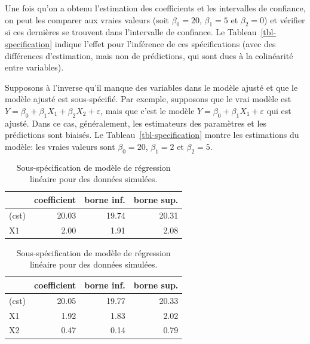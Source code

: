\documentclass[
  11pt,
  letterpaper,
]{scrbook}
\theoremstyle{definition}
\theoremstyle{remark}
\begin{document}
Une fois qu'on a obtenu l'estimation des coefficients et les intervalles
de confiance, on peut les comparer aux vraies valeurs (soit
\(\beta_0 = 20\), \(\beta_1=5\) et \(\beta_2 = 0\)) et vérifier si ces
dernières se trouvent dans l'intervalle de confiance. Le
Tableau~\ref{tbl-specification} indique l'effet pour l'inférence de ces
spécifications (avec des différences d'estimation, mais non de
prédictions, qui sont dues à la colinéarité entre variables).

Supposons à l'inverse qu'il manque des variables dans le modèle ajusté
et que le modèle ajusté est sous-spécifié. Par exemple, supposons que le
vrai modèle est \(Y=\beta_0+\beta_1X_1+\beta_2X_2+\varepsilon\), mais
que c'est le modèle \(Y=\beta_0+\beta_1X_1+\varepsilon\) qui est ajusté.
Dans ce cas, généralement, les estimateurs des paramètres et les
prédictions sont biaisés. Le Tableau~\ref{tbl-specification} montre les
estimations du modèle: les vraies valeurs sont \(\beta_0=20\),
\(\beta_1 = 2\) et \(\beta_2 = 5\).

\begin{table}

\caption{\label{tbl-specification2}Sous-spécification de modèle de
régression linéaire pour des données
simulées.}\begin{minipage}[t]{\linewidth}

{\centering 

\centering
\begin{tabular}[t]{lrrr}
\toprule
  & coefficient & borne inf. & borne sup.\\
\midrule
(cst) & 20.03 & 19.74 & 20.31\\
X1 & 2.00 & 1.91 & 2.08\\
\bottomrule
\end{tabular}

}

\end{minipage}%
\newline
\begin{minipage}[t]{\linewidth}

{\centering 

\centering
\begin{tabular}[t]{lrrr}
\toprule
  & coefficient & borne inf. & borne sup.\\
\midrule
(cst) & 20.05 & 19.77 & 20.33\\
X1 & 1.92 & 1.83 & 2.02\\
X2 & 0.47 & 0.14 & 0.79\\
\bottomrule
\end{tabular}

}

\end{minipage}%

\end{table}
\end{document}
